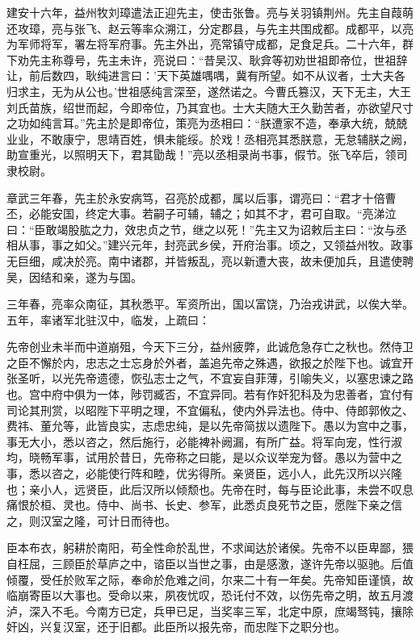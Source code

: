 \documentclass[12pt,UTF8]{ctexbook}
\begin{document}
建安十六年，益州牧刘璋遣法正迎先主，使击张鲁。亮与关羽镇荆州。先主自葭萌还攻璋，亮与张飞、赵云等率众溯江，分定郡县，与先主共围成都。成都平，以亮为军师将军，署左将军府事。先主外出，亮常镇守成都，足食足兵。二十六年，群下劝先主称尊号，先主未许，亮说曰：“昔吴汉、耿弇等初劝世祖即帝位，世祖辞让，前后数四，耿纯进言曰：'天下英雄喁喁，冀有所望。如不从议者，士大夫各归求主，无为从公也。'世祖感纯言深至，遂然诺之。今曹氏篡汉，天下无主，大王刘氏苗族，绍世而起，今即帝位，乃其宜也。士大夫随大王久勤苦者，亦欲望尺寸之功如纯言耳。”先主於是即帝位，策亮为丞相曰：“朕遭家不造，奉承大统，兢兢业业，不敢康宁，思靖百姓，惧未能绥。於戏！丞相亮其悉朕意，无怠辅朕之阙，助宣重光，以照明天下，君其勖哉！”亮以丞相录尚书事，假节。张飞卒后，领司隶校尉。

章武三年春，先主於永安病笃，召亮於成都，属以后事，谓亮曰：“君才十倍曹丕，必能安国，终定大事。若嗣子可辅，辅之；如其不才，君可自取。“亮涕泣曰：“臣敢竭股肱之力，效忠贞之节，继之以死！”先主又为诏敕后主曰：“汝与丞相从事，事之如父。”建兴元年，封亮武乡侯，开府治事。顷之，又领益州牧。政事无巨细，咸决於亮。南中诸郡，并皆叛乱，亮以新遭大丧，故未便加兵，且遣使聘吴，因结和亲，遂为与国。

三年春，亮率众南征，其秋悉平。军资所出，国以富饶，乃治戎讲武，以俟大举。五年，率诸军北驻汉中，临发，上疏曰：

先帝创业未半而中道崩殂，今天下三分，益州疲弊，此诚危急存亡之秋也。然侍卫之臣不懈於内，忠志之士忘身於外者，盖追先帝之殊遇，欲报之於陛下也。诚宜开张圣听，以光先帝遗德，恢弘志士之气，不宜妄自菲薄，引喻失义，以塞忠谏之路也。宫中府中俱为一体，陟罚臧否，不宜异同。若有作奸犯科及为忠善者，宜付有司论其刑赏，以昭陛下平明之理，不宜偏私，使内外异法也。侍中、侍郎郭攸之、费祎、董允等，此皆良实，志虑忠纯，是以先帝简拔以遗陛下。愚以为宫中之事，事无大小，悉以咨之，然后施行，必能裨补阙漏，有所广益。将军向宠，性行淑均，晓畅军事，试用於昔日，先帝称之曰能，是以众议举宠为督。愚以为营中之事，悉以咨之，必能使行阵和睦，优劣得所。亲贤臣，远小人，此先汉所以兴隆也；亲小人，远贤臣，此后汉所以倾颓也。先帝在时，每与臣论此事，未尝不叹息痛恨於桓、灵也。侍中、尚书、长史、参军，此悉贞良死节之臣，愿陛下亲之信之，则汉室之隆，可计日而待也。

臣本布衣，躬耕於南阳，苟全性命於乱世，不求闻达於诸侯。先帝不以臣卑鄙，猥自枉屈，三顾臣於草庐之中，谘臣以当世之事，由是感激，遂许先帝以驱驰。后值倾覆，受任於败军之际，奉命於危难之间，尔来二十有一年矣。先帝知臣谨慎，故临崩寄臣以大事也。受命以来，夙夜忧叹，恐讬付不效，以伤先帝之明，故五月渡泸，深入不毛。今南方已定，兵甲已足，当奖率三军，北定中原，庶竭驽钝，攘除奸凶，兴复汉室，还于旧都。此臣所以报先帝，而忠陛下之职分也。
\end{document}

